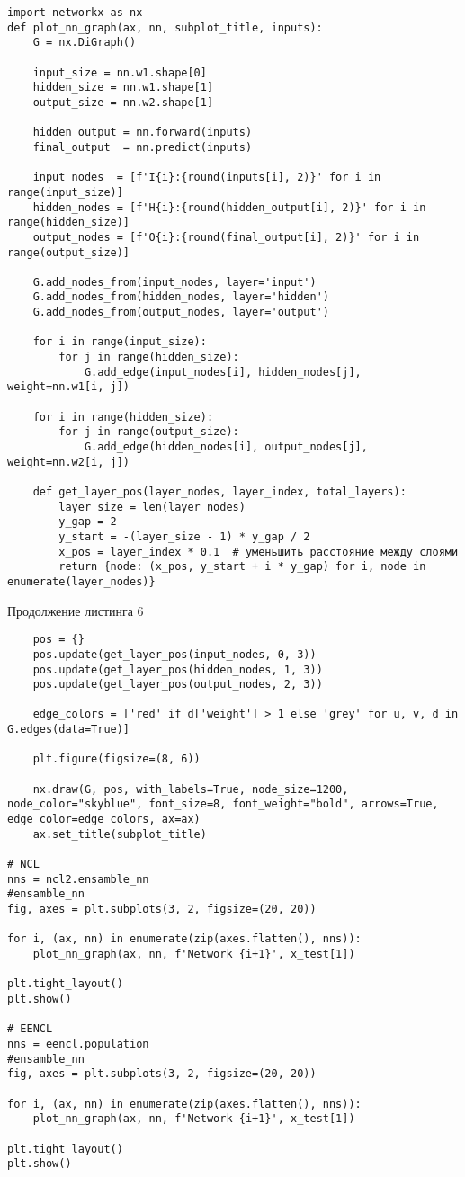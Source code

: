 \documentclass[12pt]{extarticle}
\begin{document}
\begin{lstlisting} 
import networkx as nx
def plot_nn_graph(ax, nn, subplot_title, inputs):
    G = nx.DiGraph()

    input_size = nn.w1.shape[0]
    hidden_size = nn.w1.shape[1]
    output_size = nn.w2.shape[1]

    hidden_output = nn.forward(inputs)
    final_output  = nn.predict(inputs)

    input_nodes  = [f'I{i}:{round(inputs[i], 2)}' for i in range(input_size)]
    hidden_nodes = [f'H{i}:{round(hidden_output[i], 2)}' for i in range(hidden_size)]
    output_nodes = [f'O{i}:{round(final_output[i], 2)}' for i in range(output_size)]

    G.add_nodes_from(input_nodes, layer='input')
    G.add_nodes_from(hidden_nodes, layer='hidden')
    G.add_nodes_from(output_nodes, layer='output')

    for i in range(input_size):
        for j in range(hidden_size):
            G.add_edge(input_nodes[i], hidden_nodes[j], weight=nn.w1[i, j])

    for i in range(hidden_size):
        for j in range(output_size):
            G.add_edge(hidden_nodes[i], output_nodes[j], weight=nn.w2[i, j])

    def get_layer_pos(layer_nodes, layer_index, total_layers):
        layer_size = len(layer_nodes)
        y_gap = 2
        y_start = -(layer_size - 1) * y_gap / 2
        x_pos = layer_index * 0.1  # уменьшить расстояние между слоями
        return {node: (x_pos, y_start + i * y_gap) for i, node in enumerate(layer_nodes)}
\end{lstlisting}

\newpage

Продолжение листинга 6

\begin{lstlisting}
    pos = {}
    pos.update(get_layer_pos(input_nodes, 0, 3))
    pos.update(get_layer_pos(hidden_nodes, 1, 3))
    pos.update(get_layer_pos(output_nodes, 2, 3))

    edge_colors = ['red' if d['weight'] > 1 else 'grey' for u, v, d in G.edges(data=True)]

    plt.figure(figsize=(8, 6))

    nx.draw(G, pos, with_labels=True, node_size=1200, node_color="skyblue", font_size=8, font_weight="bold", arrows=True, edge_color=edge_colors, ax=ax)
    ax.set_title(subplot_title)

# NCL
nns = ncl2.ensamble_nn
#ensamble_nn
fig, axes = plt.subplots(3, 2, figsize=(20, 20))

for i, (ax, nn) in enumerate(zip(axes.flatten(), nns)):
    plot_nn_graph(ax, nn, f'Network {i+1}', x_test[1])

plt.tight_layout()
plt.show()

# EENCL
nns = eencl.population
#ensamble_nn
fig, axes = plt.subplots(3, 2, figsize=(20, 20))

for i, (ax, nn) in enumerate(zip(axes.flatten(), nns)):
    plot_nn_graph(ax, nn, f'Network {i+1}', x_test[1])

plt.tight_layout()
plt.show()

\end{lstlisting}
\end{document}
